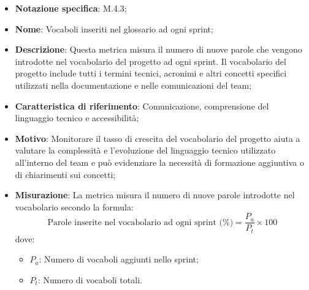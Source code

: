 \begin{itemize}
    \item \textbf{Notazione specifica}: M.4.3;
    \item \textbf{Nome}: Vocaboli inseriti nel glossario ad ogni sprint;
    \item \textbf{Descrizione}: Questa metrica misura il numero di nuove parole che vengono introdotte nel vocabolario del progetto ad ogni sprint. Il vocabolario del progetto include tutti i termini tecnici, acronimi e altri concetti specifici utilizzati nella documentazione e nelle comunicazioni del team;
    \item \textbf{Caratteristica di riferimento}: Comunicazione, comprensione del linguaggio tecnico e accessibilità;
    \item \textbf{Motivo}: Monitorare il tasso di crescita del vocabolario del progetto aiuta a valutare la complessità e l'evoluzione del linguaggio tecnico utilizzato all'interno del team e può evidenziare la necessità di formazione aggiuntiva o di chiarimenti sui concetti;
    \item \textbf{Misurazione}: La metrica misura il numero di nuove parole introdotte nel vocabolario secondo la formula:
    \[
        \text{Parole inserite nel vocabolario ad ogni sprint (\%)} =\frac{P_{a}}{P_{t}} \times 100 
    \]
    dove:
    \begin{itemize}
        \item $P_{a}$: Numero di vocaboli aggiunti nello sprint;
        \item $P_{t}$: Numero di vocaboli totali.
    \end{itemize}
    
    
\end{itemize}
